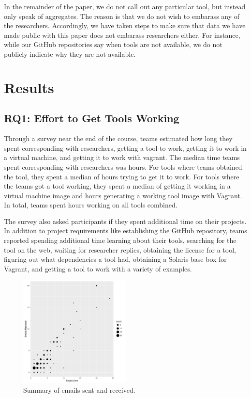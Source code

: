 \documentclass[10pt,conference]{IEEEtran}
\begin{document}
In the remainder of the paper, we do not call out 
any particular tool, but instead only speak of aggregates.
The reason is that we do not wish to embarass any of the researchers.
Accordingly, we have taken steps to make sure that data we have made 
public with this paper does not embarass researchers either.
For instance, while our GitHub repositories say when tools are 
not available, we do not publicly indicate why they are
not available.

\section{Results}

\subsection{RQ1: Effort to Get Tools Working}

Through a survey near the end of the course, 
teams estimated how long they spent
corresponding with researchers,
getting a tool to work,
getting it to work in a virtual machine,
and getting it to work with vagrant.
The median time teams spent corresponding with
researchers was \durationCorresponding hours.
For tools where teams obtained the tool,
they spent a median of \durationWorking hours
trying to get it to work.
For tools where the teams got a tool working,
they spent a median of \durationVM getting it working 
in a virtual machine image and
\durationVagrant hours generating a working tool
image with Vagrant.
In total, teams spent \durationTotal hours working
on all tools combined.


The survey also asked participants if they spent
additional time on their projects.
In addition to project requirements like establishing
the GitHub repository, teams 
reported spending additional time 
learning about their tools,
searching for the tool on the web,
waiting for researcher replies,
obtaining the license for a tool,
figuring out what dependencies a tool had,
obtaining a Solaris base box for Vagrant,
and
getting a tool to work with a variety of examples.

\begin{figure}[!ht]
  \centering
    \includegraphics[width=0.5\textwidth]{emailPlot.pdf}
  \caption{Summary of emails sent and received.}\label{fig:emailSnR}
\end{figure}
\end{document}
